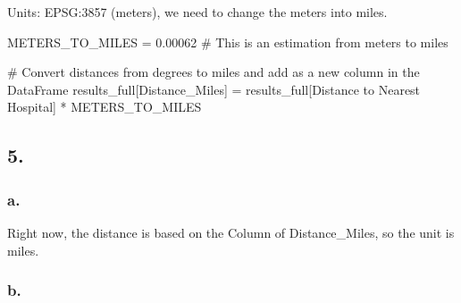 \documentclass[
  letterpaper,
  DIV=11,
  numbers=noendperiod]{scrartcl}
\newenvironment{Shaded}{\begin{snugshade}}{\end{snugshade}}
\newcommand{\CommentTok}[1]{\textcolor[rgb]{0.37,0.37,0.37}{#1}}
\newcommand{\FloatTok}[1]{\textcolor[rgb]{0.68,0.00,0.00}{#1}}
\newcommand{\NormalTok}[1]{\textcolor[rgb]{0.00,0.23,0.31}{#1}}
\newcommand{\OperatorTok}[1]{\textcolor[rgb]{0.37,0.37,0.37}{#1}}
\newcommand{\StringTok}[1]{\textcolor[rgb]{0.13,0.47,0.30}{#1}}
\begin{document}
Units: EPSG:3857 (meters), we need to change the meters into miles.

\begin{Shaded}
\begin{Highlighting}[]
\NormalTok{METERS\_TO\_MILES }\OperatorTok{=} \FloatTok{0.00062}  \CommentTok{\# This is an estimation from meters to miles}

\CommentTok{\# Convert distances from degrees to miles and add as a new column in the DataFrame}
\NormalTok{results\_full[}\StringTok{\textquotesingle{}Distance\_Miles\textquotesingle{}}\NormalTok{] }\OperatorTok{=}\NormalTok{ results\_full[}\StringTok{\textquotesingle{}Distance to Nearest Hospital\textquotesingle{}}\NormalTok{] }\OperatorTok{*}\NormalTok{ METERS\_TO\_MILES}
\end{Highlighting}
\end{Shaded}

\subsection{5.}\label{section-7}

\subsubsection{a.}\label{a.-2}

Right now, the distance is based on the Column of Distance\_Miles, so
the unit is miles.

\subsubsection{b.}\label{b.-2}
\end{document}
